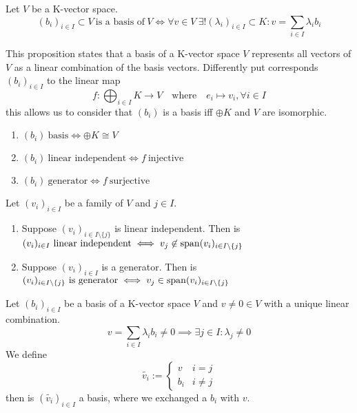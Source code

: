 \begin{proposition}
   Let \(V\) be a K-vector space.
   \[(b_i)_{i \in I} \subset V~\text{is a basis of}~V \iff \forall v \in V~\exists! (\lambda_i)_{i \in I} \subset K: v = \sum_{i \in I} \lambda_i b_i\]
\end{proposition}
\begin{remark}
   This proposition states that a basis of a K-vector space \(V\) represents all vectors of \(V\) as a linear combination of the basis vectors.
   Differently put corresponds \((b_i)_{i \in I}\) to the linear map
   \[f: \bigoplus_{i \in I} K \to V \quad\text{where}\quad e_i \mapsto v_i, \forall i \in I\]
   this allows us to consider that \((b_i)\) is a basis iff \(\oplus K\) and \(V\) are isomorphic.
   \begin{enumerate}
      \item \((b_i)~\text{basis} \iff \oplus K \cong V\)
      \item \((b_i)~\text{linear independent} \iff f~\text{injective}\)
      \item \((b_i)~\text{generator} \iff f~\text{surjective}\)
   \end{enumerate}
\end{remark}

\begin{lemma}\label{lem:extending_family}
   Let \((v_i)_{i \in I}\) be a family of \(V\) and \(j \in I\).
   \begin{enumerate}[label=\roman*, align=Center]
      \item Suppose \((v_i)_{i \in I \setminus \{j\}}\) is linear independent. Then is \((v_i)_{i \in I}~\text{linear independent} \iff v_j \not\in \operatorname{span}(v_i)_{i \in I \setminus \{j\}}\)
      \item Suppose \((v_i)_{i \in I}\) is a generator. Then is \((v_i)_{i \in I \setminus \{j\}}~\text{is generator} \iff v_j \in \operatorname{span}(v_i)_{i \in I \setminus \{j\}}\)
   \end{enumerate}
\end{lemma}

\begin{lemma}\label{lem:exchange}
   Let \((b_i)_{i \in I}\) be a basis of a K-vector space \(V\) and \(v \neq 0 \in V\) with a unique linear combination.
   \[v = \sum_{i \in I} \lambda_i b_i \neq 0 \implies \exists j \in I: \lambda_j \neq 0\]
   We define
   \[\tilde{v_i} := \begin{cases} v & i = j\\ b_i & i \neq j\end{cases}\]
   then is \((\tilde{v_i})_{i \in I}\) a basis, where we exchanged a \(b_i\) with \(v\).
\end{lemma}

